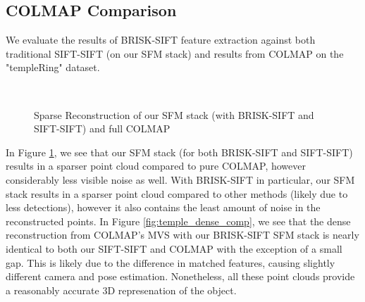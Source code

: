 \documentclass[conference,compsoc]{IEEEtran}
\begin{document}
\subsection{COLMAP Comparison}
We evaluate the results of BRISK-SIFT feature extraction against both 
traditional SIFT-SIFT (on our SFM stack) and results from COLMAP on 
the "templeRing" \cite{temple} dataset. 
\begin{figure}[ht!]
    \centering
    \ \ \ 
    \\
    \caption{Sparse Reconstruction of our SFM stack (with BRISK-SIFT and SIFT-SIFT) and full COLMAP}
    \label{fig:temple_sparse_comp}
\end{figure}
In Figure \ref{fig:temple_sparse_comp}, we see that our SFM stack (for both
BRISK-SIFT and SIFT-SIFT) results in a sparser point cloud compared to 
pure COLMAP, however considerably less visible noise as well. 
With BRISK-SIFT in particular, our SFM stack results in a sparser point cloud
compared to other methods (likely due to less detections), however it also 
contains the least amount of noise in the reconstructed points. In 
Figure \ref{fig:temple_dense_comp}, we see that the dense reconstruction from 
COLMAP's MVS \cite{schoenberger2016mvs} with our BRISK-SIFT SFM stack is nearly identical to both 
our SIFT-SIFT and COLMAP with the exception of a small gap. This is likely due to 
the difference in matched features, causing slightly different camera and pose estimation.
Nonetheless, all these point clouds provide a reasonably accurate 3D represenation
of the object. 
\end{document}
